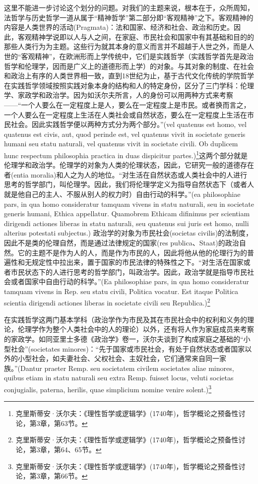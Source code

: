 这里不能进一步讨论这个划分的问题。对我们的主题来说，根本在于，众所周知，法哲学与历史哲学一道从属于“精神哲学”第二部分即“客观精神”之下。客观精神的内容是人类世界的活动(Pragmata)：法和国家、经济和社会、政治和历史。因此，客观精神学说即以人与人之间，在家庭、市民社会和国家中有其基础和目的的那些人类行为为主题。这些行为就其本身的意义而言并不超越于人世之外，而是人世的“客观精神”，在欧洲形而上学传统中，它们是实践哲学（实践哲学首先是政治哲学和伦理学，因而是广义上的道德形而上学）的对象。与其对象的制度、在社会和政治上有序的人类世界相一致，直到18世纪为止，基于古代文化传统的学院哲学在实践哲学领域按照实践对象本身的结构和人的特定身份，区分了三门学科：伦理学、家政学和政治学。因为如沃尔夫所言，人的身份可以用两种方式来考察——“一个人要么在一定程度上是人，要么在一定程度上是市民。或者换而言之，一个人要么在一定程度上生活在人类社会或自然状态，要么在一定程度上生活在市民社会。因此实践哲学便以两种方式分为两个部分。”(vel quatenus est homo, vel quatenus est civis, aut, quod perinde est, vel quatenus vivit in societate generis humani seu statu naturali, vel quatenus vivit in societate civili. Ob duplicem hunc respectum philosophia practica in duas dispicitur partes.)\footnote{克里斯蒂安·沃尔夫：《理性哲学或逻辑学》(1740年)，哲学概论之预备性讨论，第3章，第63节。}这两个部分就是伦理学和政治学。伦理学的对象为人类的伦理状态，因此，它研究一般的道德存在者(entia moralia)和人之为人的地位。“对生活在自然状态或人类社会中的人进行思考的哲学部门，叫伦理学。因此，我们将伦理学定义为指导自然状态下（或者人就是他自己的主人、不服从别人的权力时）自由行动的科学。”(ea philosophiae pars, in qua homo consideratur tamquam vivens in statu naturali, seu in societate generis humani, Ethica appellatur. Quamobrem Ethicam difinimus per scientiam dirigendi actiones liberas in statu naturali, seu quatenus sui juris est homo, nulli alterius potestati subjectus.) 政治学的对象为市民社会(societas civilis)的法制度，因此不是类的伦理自然，而是通过法律规定的国家(res publica、Staat)的政治自然。它的主题不是作为人的人，而是作为市民的人，因此将他从他的伦理行为的普遍性和无规定性中拉出来，置于国家的市民法律的特殊性之下。“对生活在国家或者市民状态下的人进行思考的哲学部门，叫政治学。因此，政治学就是指导市民社会或者国家中自由行动的科学。”(Ea philosophiae pars, in qua homo consideratur tamquam vivens in Rep. seu statu civili, Politica vocatur. Est itaque Politica scientia dirigendi actiones liberas in societate civili seu Republica.)\footnote{克里斯蒂安·沃尔夫：《理性哲学或逻辑学》(1740年)，哲学概论之预备性讨论，第3章，第64、65节。}

在实践哲学这两门基本学科（政治学作为市民及其在市民社会中的权利和义务的理论，伦理学作为整个人类社会中的人的理论）以外，还有将人作为家庭成员来考察的家政学。如同亚里士多德《政治学》卷一，沃尔夫谈到了构成家庭之基础的“小型社会”(societates minores)：“先于国家或市民社会，有处于自然状态或者国家以外的小型社会，如夫妻社会、父权社会、主奴社会，它们通常来自同一家族。”(Dantur praeter Remp. seu societatem civilem societates aliae minores, quibus etiam in statu naturali seu extra Remp. fuisset locus, veluti societas conjugialis, paterna, herilis, quae simplicium nomine venire solent.)\footnote{克里斯蒂安·沃尔夫：《理性哲学或逻辑学》(1740年)，哲学概论之预备性讨论，第3章，第66节。}

